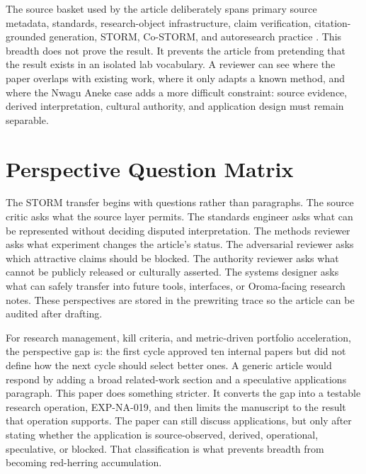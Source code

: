 \documentclass[sigconf,nonacm]{acmart}
\begin{document}
The source basket used by the article deliberately spans primary source
metadata, standards, research-object infrastructure, claim verification,
citation-grounded generation, STORM, Co-STORM, and autoresearch practice
\cite{azuonye1992,omniglotNwagu,unicodeAfricanScripts2023,scriptSourceNwagu,sirisNwaguProposal,teiP5Glyphs,iiifPresentation3,w3cAnnotationModel,w3cAnnotationVocab,w3cProvO,rocrate12,cidocCrm,datacite45,wilkinson2016fair,carroll2020care,wadden2020scifact,gao2023alce,karpathyAutoresearch,shao2024storm,jiang2024costorm,acmSubmissions,arxivSubmitTex}. This breadth does not prove the result. It prevents the article
from pretending that the result exists in an isolated lab vocabulary. A
reviewer can see where the paper overlaps with existing work, where it only
adapts a known method, and where the Nwagu Aneke case adds a more difficult
constraint: source evidence, derived interpretation, cultural authority, and
application design must remain separable.

\section{Perspective Question Matrix}
The STORM transfer begins with questions rather than paragraphs. The source
critic asks what the source layer permits. The standards engineer asks what can
be represented without deciding disputed interpretation. The methods reviewer
asks what experiment changes the article's status. The adversarial reviewer asks
which attractive claims should be blocked. The authority reviewer asks what
cannot be publicly released or culturally asserted. The systems designer asks
what can safely transfer into future tools, interfaces, or Oroma-facing
research notes. These perspectives are stored in the prewriting trace so the
article can be audited after drafting.

For research management, kill criteria, and metric-driven portfolio acceleration, the perspective gap is: the first cycle approved ten internal papers but did not define how the next cycle should select better ones. A generic article would respond by
adding a broad related-work section and a speculative applications paragraph.
This paper does something stricter. It converts the gap into a testable
research operation, EXP-NA-019, and then limits the manuscript to the result
that operation supports. The paper can still discuss applications, but only
after stating whether the application is source-observed, derived, operational,
speculative, or blocked. That classification is what prevents breadth from
becoming red-herring accumulation.
\end{document}
